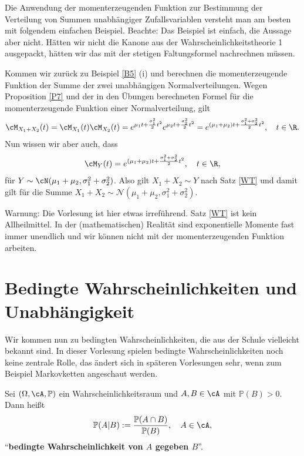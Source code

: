 Die Anwendung der momenterzeugenden Funktion zur Bestimmung der Verteilung von Summen unabh\"angiger Zufallsvariablen versteht man am besten mit folgendem einfachen Beispiel. Beachte: Das Beispiel ist einfach, die Aussage aber nicht. H\"atten wir nicht die Kanone aus der Wahrscheinlichkeitstheorie 1 ausgepackt, h\"atten wir das mit der stetigen Faltungsformel nachrechnen m\"ussen. 

\begin{beispiel}
	Kommen wir zur\"uck zu Beispiel \ref{B5} (i) und berechnen die momenterzeugende Funktion der Summe der zwei unabh\"angigen Normalverteilungen. Wegen Proposition \ref{P7} und der in den \"Ubungen berechneten Formel f\"ur die momenterzeugende Funktion einer Normalverteilung, gilt
	\begin{gather*}
		\cM_{X_1+X_2}(t) = \cM_{X_1}(t)\cM_{X_2}(t) = e^{\mu_1 t + \frac{\sigma_1^2}{2}t^2} e^{\mu_2 t + \frac{\sigma_2^2}{2}t^2}=e^{(\mu_1+\mu_2)t + \frac{\sigma_1^2 + \sigma_2^2}{2}t^2},\quad t\in\R.
	\end{gather*}
	Nun wissen wir aber auch, dass
	\begin{align*}
		\cM_Y(t)=e^{(\mu_1+\mu_2)t + \frac{\sigma_1^2 + \sigma_2^2}{2}t^2}, \quad t\in\R,
	\end{align*}
	 f\"ur $Y \sim \cN(\mu_1 + \mu_2, \sigma_1^2 + \sigma_2^2)$. Also gilt $X_1+X_2\sim Y$ nach Satz \ref{WT} und damit gilt f\"ur die Summe $X_1+X_2\sim \mathcal N(\mu_1+\mu_2,\sigma_1^2 + \sigma_2^2)$.
\end{beispiel}
Warnung: Die Vorlesung ist hier etwas irref\"uhrend. Satz \ref{WT} ist kein Allheilmittel. In der (mathematischen) Realit\"at sind exponentielle Momente fast immer unendlich und wir k\"onnen nicht mit der momenterzeugenden Funktion arbeiten. 



\marginpar{\textcolor{red}{Vorlesung 23}}

\section{Bedingte Wahrscheinlichkeiten und Unabhängigkeit}\label{Sunab}
Wir kommen nun zu bedingten Wahrscheinlichkeiten, die aus der Schule vielleicht bekannt sind. In dieser Vorlesung spielen bedingte Wahrscheinlichkeiten noch keine zentrale Rolle, das \"andert sich in sp\"ateren Vorlesungen sehr, wenn zum Beispiel Markovketten angeschaut werden.
\begin{deff}
	Sei $(\Omega, \cA, \mathbb P)$ ein Wahrscheinlichkeitsraum und $A, B \in \cA$ mit $ \mathbb P(B)> 0$. Dann heißt \[ \mathbb{P}(A|B) := \frac{\mathbb{P}(A \cap B)}{\mathbb{P}(B)}, \quad A \in \cA, \]
	\enquote{\textbf{bedingte Wahrscheinlichkeit von $A$ gegeben $B$}}.	
\end{deff}

